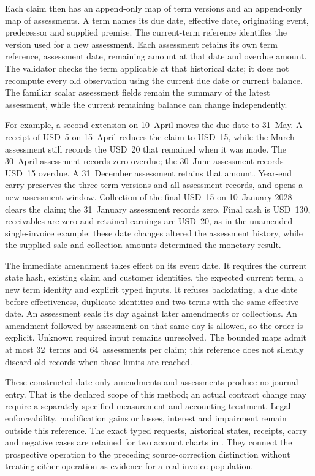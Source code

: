 Each claim then has an append-only map of term versions and an append-only
map of assessments. A term names its due date, effective date, originating
event, predecessor and supplied premise. The current-term reference identifies
the version used for a new assessment. Each assessment retains its own term
reference, assessment date, remaining amount at that date and overdue amount.
The validator checks the term applicable at that historical date; it does not
recompute every old observation using the current due date or current balance.
The familiar scalar assessment fields remain the summary of the latest
assessment, while the current remaining balance can change independently.

For example, a second extension on 10~April moves the due date to 31~May.
A receipt of USD~5 on 15~April reduces the claim to USD~15, while the March
assessment still records the USD~20 that remained when it was made. The
30~April assessment records zero overdue; the 30~June assessment records
USD~15 overdue. A 31~December assessment retains that amount. Year-end carry
preserves the three term versions and all assessment records, and opens a new
assessment window. Collection of the final USD~15 on 10~January 2028 clears
the claim; the 31~January assessment records zero. Final cash is USD~130,
receivables are zero and retained earnings are USD~20, as in the unamended
single-invoice example: these date changes altered the assessment history,
while the supplied sale and collection amounts determined the monetary result.

The immediate amendment takes effect on its event date. It requires the
current state hash, existing claim and customer identities, the expected
current term, a new term identity and explicit typed inputs. It refuses
backdating, a due date before effectiveness, duplicate identities and two
terms with the same effective date. An assessment seals its day against later
amendments or collections. An amendment followed by assessment on that same
day is allowed, so the order is explicit. Unknown required input remains
unresolved. The bounded maps admit at most 32~terms and 64~assessments per
claim; this reference does not silently discard old records when those limits
are reached.

These constructed date-only amendments and assessments produce no journal
entry. That is the declared scope of this method; an actual contract change
may require a separately specified measurement and accounting treatment.
Legal enforceability, modification gains or losses, interest and impairment
remain outside this reference. The exact typed requests, historical states,
receipts, carry and negative cases are retained for two account charts in
. They connect
the prospective operation to the preceding source-correction distinction
without treating either operation as evidence for a real invoice population.



